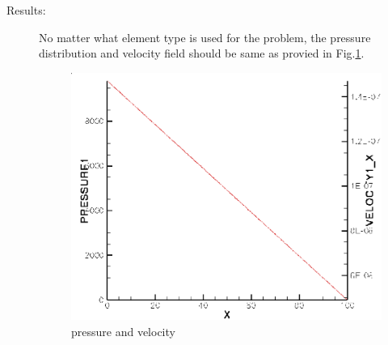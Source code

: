 \begin{description}
\item[Results:] No matter what element type is used for the problem, the pressure distribution and velocity field should be same as provied in Fig.\ref{fm:1d-result}.
\begin{figure}[h]
\begin{center}
\includegraphics[scale=0.40]{FLUID_MOMENTUM/figures/1d-result.eps}
\end{center}
\caption{pressure and velocity}
\label{fm:1d-result}
\end{figure}



\end{description}
